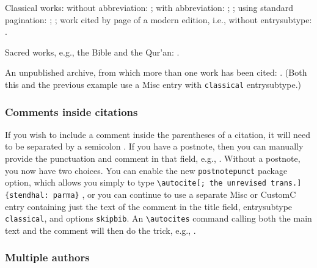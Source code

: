 \documentclass[a4paper,12pt]{report}
\newcommand{\cmd}[1]{\texttt{\textbackslash #1}}
\begin{document}

Classical works: without abbreviation:
\autocite{aristotle:metaphy:trans}; with abbreviation:
\autocite{aristotle:metaphy:gr}; \autocite{plato:republic:gr}; using
standard pagination: \autocite*[3.2.996b5--8]{aristotle:metaphy:gr};
\autocite*[420e]{plato:republic:gr}; work cited by page of a modern
edition, i.e., without \textsf{entrysubtype}:
\autocite[198]{euripides:orestes}.

Sacred works, e.g., the Bible and the Qur'an:
\autocite[25:19--36:43]{genesis}.

An unpublished archive, from which more than one work has been cited:
\autocite[file 12]{house:papers}.  (Both this and the previous example
use a Misc entry with \texttt{classical} \textsf{entrysubtype}.)

\subsubsection*{Comments inside citations}
\label{sec:comments}

If you wish to include a comment inside the parentheses of a citation,
it will need to be separated by a semicolon
\autocite[15.23]{chicago:manual}.  If you have a \textsf{postnote},
then you can manually provide the punctuation and comment in that
field, e.g., \autocite[4; the unrevised trans.]{stendhal:parma}.
Without a \textsf{postnote}, you now have two choices.  You can enable
the new \texttt{postnotepunct} package option, which allows you simply
to type \cmd{autocite[; the unrevised trans.]\{stendhal:\ parma\}}
\citereset\autocite[; the unrevised trans.]{stendhal:parma}, or you
can continue to use a separate \textsf{Misc} or \textsf{CustomC} entry
containing just the text of the comment in the \textsf{title} field,
\textsf{entrysubtype} \texttt{classical}, and \textsf{options}
\texttt{skipbib}.  An \cmd{autocites} command calling both the main
text and the comment will then do the trick, e.g.,
\autocites{chicago:manual}{chicago:comment}.

\subsubsection*{Multiple authors}
\label{sec:multiple}
\end{document}
